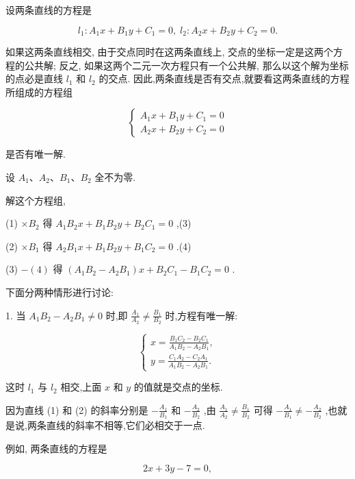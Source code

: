 \documentclass[lang=cn,newtx,12pt,scheme=chinese]{elegantbook}
\begin{document}
设两条直线的方程是

\[
    {l}_{1} : {A}_{1}x + {B}_{1}y + {C}_{1} = 0,\;{l}_{2} : {A}_{2}x + {B}_{2}y + {C}_{2} = 0.
\]

如果这两条直线相交, 由于交点同时在这两条直线上, 交点的坐标一定是这两个方程的公共解; 反之, 如果这两个二元一次方程只有一个公共解, 那么以这个解为坐标的点必是直线 \({l}_{1}\) 和 \({l}_{2}\) 的交点. 因此,两条直线是否有交点,就要看这两条直线的方程所组成的方程组

\[
  \left\{ \begin{array}{l} {A}_{1}x + {B}_{1}y + {C}_{1} = 0 \\ {A}_{2}x + {B}_{2}y + {C}_{2} = 0 \end{array}\right. \tag{1 2}
\]

是否有唯一解.

设 \({A}_{1}\text{、}{A}_{2}\text{、}{B}_{1}\text{、}{B}_{2}\) 全不为零.

解这个方程组,

(1) \(\times {B}_{2}\) 得 \({A}_{1}{B}_{2}x + {B}_{1}{B}_{2}y + {B}_{2}{C}_{1} = 0\) ,(3)

(2) \(\times {B}_{1}\) 得 \({A}_{2}{B}_{1}x + {B}_{1}{B}_{2}y + {B}_{1}{C}_{2} = 0\) .(4)

(3) \(- \left( 4\right)\) 得 \(\left( {{A}_{1}{B}_{2} - {A}_{2}{B}_{1}}\right) x + {B}_{2}{C}_{1} - {B}_{1}{C}_{2} = 0\) .

下面分两种情形进行讨论:

1. 当 \({A}_{1}{B}_{2} - {A}_{2}{B}_{1} \neq 0\) 时,即 \(\frac{{A}_{1}}{{A}_{2}} \neq \frac{{B}_{1}}{{B}_{2}}\) 时,方程有唯一解:

\[
  \left\{ \begin{array}{l} x = \frac{{B}_{1}{C}_{2} - {B}_{2}{C}_{1}}{{A}_{1}{B}_{2} - {A}_{2}{B}_{1}}, \\ y = \frac{{C}_{1}{A}_{2} - {C}_{2}{A}_{1}}{{A}_{1}{B}_{2} - {A}_{2}{B}_{1}}. \end{array}\right.
\]

这时 \({l}_{1}\) 与 \({l}_{2}\) 相交,上面 \(x\) 和 \(y\) 的值就是交点的坐标.

因为直线 (1) 和 (2) 的斜率分别是 \(- \frac{{A}_{1}}{{B}_{1}}\) 和 \(- \frac{{A}_{2}}{{B}_{2}}\) ,由 \(\frac{{A}_{1}}{{A}_{2}} \neq \frac{{B}_{1}}{{B}_{2}}\) 可得 \(- \frac{{A}_{1}}{{B}_{1}} \neq - \frac{{A}_{2}}{{B}_{2}}\) ,也就是说,两条直线的斜率不相等,它们必相交于一点.

例如, 两条直线的方程是

\[
    {2x} + {3y} - 7 = 0,
\]
\end{document}
